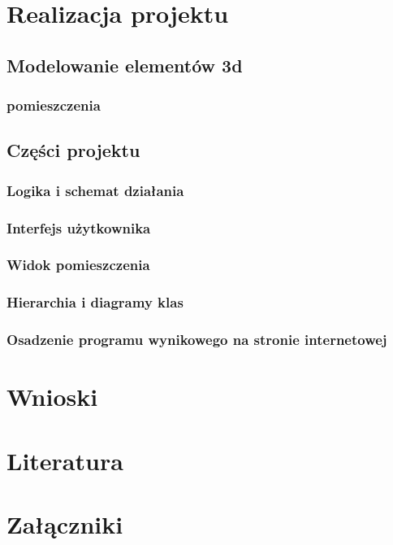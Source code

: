 \documentclass{article} %
\begin{document}
\section{Realizacja projektu}
    \subsection{Modelowanie elementów 3d}
        \subsubsection{pomieszczenia}
    \subsection{Części projektu}
        \subsubsection{Logika i schemat działania}
        \subsubsection{Interfejs użytkownika}
        \subsubsection{Widok pomieszczenia}
        \subsubsection{Hierarchia i diagramy klas}
        \subsubsection{Osadzenie programu wynikowego na stronie internetowej}



\section{Wnioski}


\newpage
\section{Literatura}

\newpage
\section{Załączniki}
\end{document}
